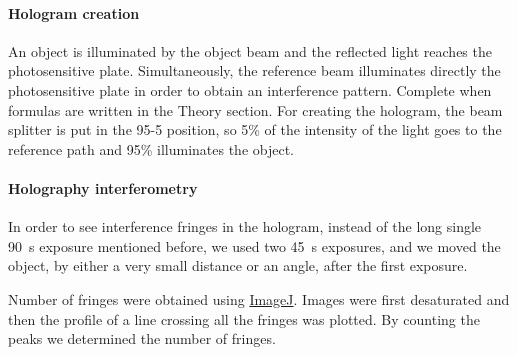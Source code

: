 \documentclass[11pt,a4paper]{article}
\begin{document}
\paragraph{Hologram creation}
An object is illuminated by the object beam and the reflected light reaches the photosensitive plate. Simultaneously, the reference beam illuminates directly the photosensitive plate in order to obtain an interference pattern. {\color{red}Complete when formulas are written in the Theory section.} For creating the hologram, the beam splitter is put in the 95-5 position, so 5\% of the intensity of the light goes to the reference path and 95\% illuminates the object.

\paragraph{Holography interferometry}
In order to see interference fringes in the hologram, instead of the long single \SI{90}{\second} exposure mentioned before, we used two \SI{45}{\second} exposures, and we moved the object, by either a very small distance or an angle, after the first exposure.

Number of fringes were obtained using \href{https://imagej.net/}{ImageJ}. Images were first desaturated and then the profile of a line crossing all the fringes was plotted. By counting the peaks we determined the number of fringes.
\end{document}
